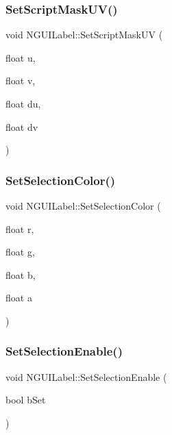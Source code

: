 \hypertarget{class_n_g_u_i_label_aa8b85395729579ab86aa6206b7247d1f}{}\label{class_n_g_u_i_label_aa8b85395729579ab86aa6206b7247d1f} 
\subsubsection{\texorpdfstring{Set\+Script\+Mask\+U\+V()}{SetScriptMaskUV()}}
{\footnotesize\ttfamily void N\+G\+U\+I\+Label\+::\+Set\+Script\+Mask\+UV (\begin{DoxyParamCaption}\item[{float}]{u,  }\item[{float}]{v,  }\item[{float}]{du,  }\item[{float}]{dv }\end{DoxyParamCaption})}

\hypertarget{class_n_g_u_i_label_a7a0ee6fe7fe0cf05aa5d280d8f135483}{}\label{class_n_g_u_i_label_a7a0ee6fe7fe0cf05aa5d280d8f135483} 
\subsubsection{\texorpdfstring{Set\+Selection\+Color()}{SetSelectionColor()}}
{\footnotesize\ttfamily void N\+G\+U\+I\+Label\+::\+Set\+Selection\+Color (\begin{DoxyParamCaption}\item[{float}]{r,  }\item[{float}]{g,  }\item[{float}]{b,  }\item[{float}]{a }\end{DoxyParamCaption})}

\hypertarget{class_n_g_u_i_label_ac8c8dfb1322cca4aba2545da11dbc962}{}\label{class_n_g_u_i_label_ac8c8dfb1322cca4aba2545da11dbc962} 
\subsubsection{\texorpdfstring{Set\+Selection\+Enable()}{SetSelectionEnable()}}
{\footnotesize\ttfamily void N\+G\+U\+I\+Label\+::\+Set\+Selection\+Enable (\begin{DoxyParamCaption}\item[{bool}]{b\+Set }\end{DoxyParamCaption})}

